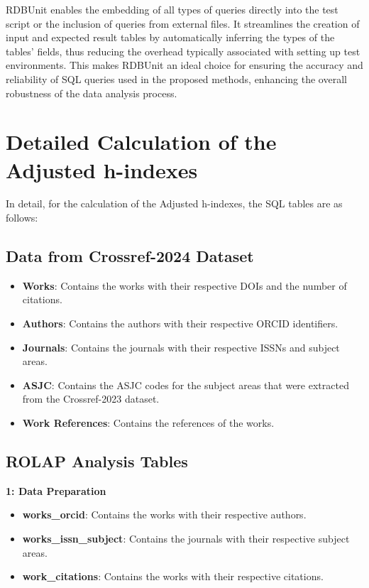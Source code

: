RDBUnit enables the embedding of all types of queries directly into the test
script or the inclusion of queries from external files. It streamlines the
creation of input and expected result tables by automatically inferring the
types of the tables' fields, thus reducing the overhead typically associated
with setting up test environments. This makes RDBUnit an ideal choice for
ensuring the accuracy and reliability of SQL queries used in the proposed
methods, enhancing the overall robustness of the data analysis process.

\section{Detailed Calculation of the Adjusted h-indexes}

In detail, for the calculation of the Adjusted h-indexes, the SQL tables are as
follows:

\subsection{Data from Crossref-2024 Dataset}
\begin{itemize}
      \item \textbf{Works}: Contains the works with their respective DOIs and the number of citations.
      \item \textbf{Authors}: Contains the authors with their respective ORCID identifiers.
      \item \textbf{Journals}: Contains the journals with their respective ISSNs and subject areas.
      \item \textbf{ASJC}: Contains the ASJC codes for the subject areas that were extracted from the Crossref-2023 dataset.
      \item \textbf{Work References}: Contains the references of the works.
\end{itemize}

\subsection{ROLAP Analysis Tables}

\noindent\textbf{1: Data Preparation}
\begin{itemize}
      \item \textbf{works\_orcid}: Contains the works with their respective authors.
      \item \textbf{works\_issn\_subject}: Contains the journals with their respective subject areas.
      \item \textbf{work\_citations}: Contains the works with their respective citations.
\end{itemize}


